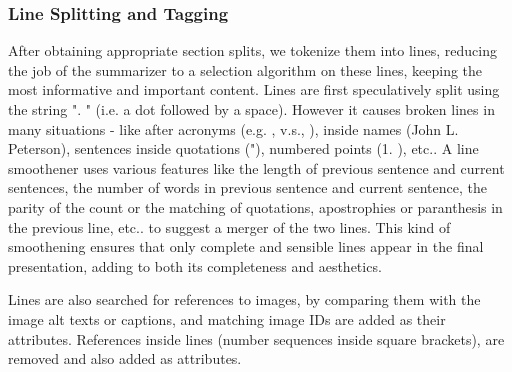 \subsubsection{Line Splitting and Tagging}

After obtaining appropriate section splits, we tokenize them into lines, reducing the job of the
summarizer to a selection algorithm on these lines, keeping the most informative and important
content. Lines are first speculatively split using the string ". " (i.e. a dot followed by a space).
However it causes broken lines in many situations - like after acronyms (e.g. , v.s., ), inside
names (John L. Peterson), sentences inside quotations ("), numbered points (1. ), etc.. A line
smoothener uses various features like the length of previous sentence and current sentences,
the number of words in previous sentence and current sentence, the parity of the count or the matching
of quotations, apostrophies or paranthesis in the previous line, etc.. to suggest a merger of the two
lines. This kind of smoothening ensures that only complete and sensible lines appear in the final
presentation, adding to both its completeness and aesthetics.

Lines are also searched for references to images, by comparing them with the image alt texts
or captions, and matching image IDs are added as their attributes. References inside lines
(number sequences inside square brackets), are removed and also added as attributes.
